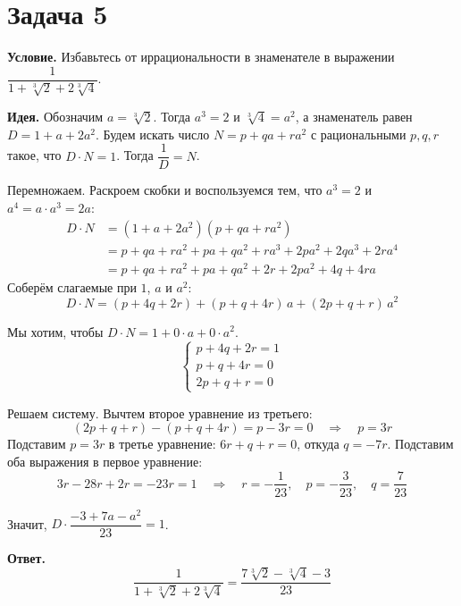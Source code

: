 \documentclass[12pt]{article}
\begin{document}
	\section*{Задача 5}

	\noindent
	\textbf{Условие.} Избавьтесь от иррациональности в знаменателе в выражении $\dfrac{1}{1 + \sqrt[3]{2} + 2\sqrt[3]{4}}$.

	\medskip
	\noindent
	\textbf{Идея.} Обозначим $a = \sqrt[3]{2}$. Тогда $a^3 = 2$ и $\sqrt[3]{4} = a^2$, а знаменатель равен $D = 1 + a + 2a^2$. Будем искать число $N = p + qa + ra^2$ с рациональными $p, q, r$ такое, что $D \cdot N = 1$. Тогда $\dfrac{1}{D} = N$.

	\medskip
	
	Перемножаем. Раскроем скобки и воспользуемся тем, что $a^3 = 2$ и $a^4 = a \cdot a^3 = 2a$:
	\begin{align*}
		D \cdot N &= (1 + a + 2a^2)(p + qa + ra^2) \\
		&= p + qa + ra^2 + pa + qa^2 + ra^3 + 2pa^2 + 2qa^3 + 2ra^4 \\
		&= p + qa + ra^2 + pa + qa^2 + 2r + 2pa^2 + 4q + 4ra
	\end{align*}
	Соберём слагаемые при $1$, $a$ и $a^2$:
	\[
		D \cdot N = (p + 4q + 2r) + (p + q + 4r)\, a + (2p + q + r)\, a^2
	\]

	Мы хотим, чтобы $D \cdot N = 1 + 0 \cdot a + 0 \cdot a^2$.
	\[
		\begin{cases}
			p + 4q + 2r = 1 \\
			p + q + 4r = 0 \\
			2p + q + r = 0
		\end{cases}
	\]

	Решаем систему. Вычтем второе уравнение из третьего:
	\[
		(2p + q + r) - (p + q + 4r) = p - 3r = 0 \quad \Longrightarrow \quad p = 3r
	\]
	Подставим $p = 3r$ в третье уравнение: $6r + q + r = 0$, откуда $q = -7r$. Подставим оба выражения в первое уравнение:
	\[
		3r - 28r + 2r = -23r = 1 \quad \Longrightarrow \quad r = -\frac{1}{23}, \quad p = -\frac{3}{23}, \quad q = \frac{7}{23}
	\]

	Значит, $D \cdot \dfrac{-3 + 7a - a^2}{23} = 1$.

	\medskip
	\noindent
	\textbf{Ответ.}
	\[
		\boxed{\frac{1}{1 + \sqrt[3]{2} + 2\sqrt[3]{4}} = \frac{7\sqrt[3]{2} - \sqrt[3]{4} - 3}{23}}
	\]
\end{document}
